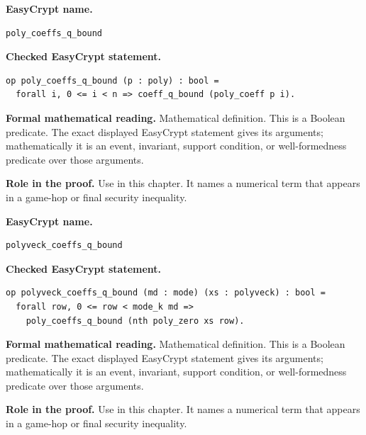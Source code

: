 \begin{formaldefinition}
\noindent\textbf{EasyCrypt name.}
\begin{lstlisting}[language=EasyCrypt,basicstyle=\ttfamily\scriptsize]
poly_coeffs_q_bound
\end{lstlisting}
\noindent\textbf{Checked EasyCrypt statement.}
\begin{lstlisting}[language=EasyCrypt,basicstyle=\ttfamily\scriptsize]
op poly_coeffs_q_bound (p : poly) : bool =
  forall i, 0 <= i < n => coeff_q_bound (poly_coeff p i).
\end{lstlisting}
\noindent\textbf{Formal mathematical reading.}
Mathematical definition. This is a Boolean predicate.  The exact displayed EasyCrypt statement gives its arguments; mathematically it is an event, invariant, support condition, or well-formedness predicate over those arguments.

\noindent\textbf{Role in the proof.}
Use in this chapter. It names a numerical term that appears in a game-hop or final security inequality.

\end{formaldefinition}

\begin{formaldefinition}
\noindent\textbf{EasyCrypt name.}
\begin{lstlisting}[language=EasyCrypt,basicstyle=\ttfamily\scriptsize]
polyveck_coeffs_q_bound
\end{lstlisting}
\noindent\textbf{Checked EasyCrypt statement.}
\begin{lstlisting}[language=EasyCrypt,basicstyle=\ttfamily\scriptsize]
op polyveck_coeffs_q_bound (md : mode) (xs : polyveck) : bool =
  forall row, 0 <= row < mode_k md =>
    poly_coeffs_q_bound (nth poly_zero xs row).
\end{lstlisting}
\noindent\textbf{Formal mathematical reading.}
Mathematical definition. This is a Boolean predicate.  The exact displayed EasyCrypt statement gives its arguments; mathematically it is an event, invariant, support condition, or well-formedness predicate over those arguments.

\noindent\textbf{Role in the proof.}
Use in this chapter. It names a numerical term that appears in a game-hop or final security inequality.

\end{formaldefinition}

